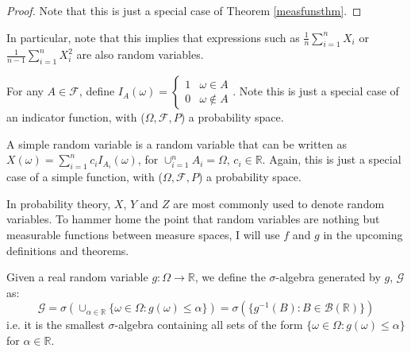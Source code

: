 \documentclass[11pt]{scrartcl}
\begin{document}
\begin{proof}
Note that this is just a special case of Theorem \ref{measfunsthm}.
\end{proof}{}

\begin{remark}
In particular, note that this implies that expressions such as 
$\frac{1}{n}\sum_{i=1}^n X_i$ or $\frac{1}{n-1}\sum_{i=1}^n X_i^2$ are also random variables.
\end{remark}{}

\begin{definition}
For any $A \in \mathcal{F}$, define
$I_A(\omega) = \begin{cases} 
1 & \omega \in A \\
 0 & \omega \notin A 
\end{cases}$.
Note this is just a special case of an indicator function, with ($\Omega,\mathcal{F},P$) a probability space.
\end{definition}{}

\begin{definition}
A simple random variable is a random variable that can be written as $X(\omega) = \sum_{i=1}^n c_i I_{A_i}(\omega)$, for $\cup_{i=1}^n A_i = \Omega$, $c_i\in \mathbb{R} $.
Again, this is just a special case of a simple function, with ($\Omega,\mathcal{F},P$) a probability space.
\end{definition}{}

\begin{example}

\end{example}{}


\begin{remark}
In probability theory, $X$, $Y$ and $Z$ are most commonly used to denote random variables. To hammer home the point that random variables are nothing but measurable functions between measure spaces, I will use $f$ and $g$ in the upcoming definitions and theorems. 
\end{remark}

\begin{definition}
Given a real random variable $g: \Omega \rightarrow \mathbb{R}$, we define the $\sigma$-algebra generated by $g$, $\mathscr{G}$ as:
$$\mathscr{G} = \sigma(\cup_{\alpha \in \mathbb{R}}\{\omega \in \Omega: g(\omega) \leq \alpha \}) = \sigma(\{g^{-1}(B) : B \in \mathcal{B}(\mathbb{R})\})   $$
i.e. it is the smallest $\sigma$-algebra containing all sets of the form $\{\omega \in \Omega: g(\omega) \leq \alpha \}$ for $\alpha \in \mathbb{R}$.

\end{definition}
\end{document}
